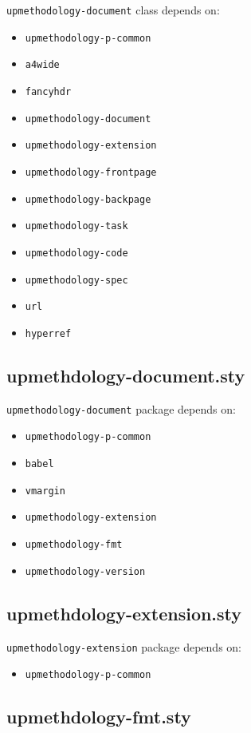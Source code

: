 \documentclass[book]{upmethodology-document}
\begin{document}
\texttt{upmethodology-document} class depends on:
\begin{itemize}
\item \texttt{upmethodology-p-common}
\item \texttt{a4wide}
\item \texttt{fancyhdr}
\item \texttt{upmethodology-document}
\item \texttt{upmethodology-extension}
\item \texttt{upmethodology-frontpage}
\item \texttt{upmethodology-backpage}
\item \texttt{upmethodology-task}
\item \texttt{upmethodology-code}
\item \texttt{upmethodology-spec}
\item \texttt{url}
\item \texttt{hyperref}
\end{itemize}

\subsection{upmethdology-document.sty}

\texttt{upmethodology-document} package depends on:
\begin{itemize}
\item \texttt{upmethodology-p-common}
\item \texttt{babel}
\item \texttt{vmargin}
\item \texttt{upmethodology-extension}
\item \texttt{upmethodology-fmt}
\item \texttt{upmethodology-version}
\end{itemize}

\subsection{upmethdology-extension.sty}

\texttt{upmethodology-extension} package depends on:
\begin{itemize}
\item \texttt{upmethodology-p-common}
\end{itemize}

\subsection{upmethdology-fmt.sty}
\end{document}
